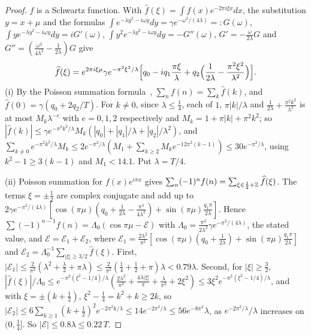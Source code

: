 \begin{proof}
$f$ is a Schwartz function. With $\widehat f(\xi)=\int f(x)e^{-2\pi i\xi x}dx$,
the substitution $y=x+\mu$ and the formulas $\int e^{-\lambda y^2-i\omega y}dy=
\gamma e^{-\omega^2/(4\lambda)}=:G(\omega)$, $\int ye^{-\lambda y^2-i\omega y}dy
=iG'(\omega)$, $\int y^2e^{-\lambda y^2-i\omega y}dy=-G''(\omega)$, $G'=-\frac
\omega{2\lambda}G$ and $G''=(\frac{\omega^2}{4\lambda^2}-\frac1{2\lambda})G$ give
\[
\widehat f(\xi)=e^{2\pi i\xi\mu}\gamma e^{-\pi^2\xi^2/\lambda}\Bigl[q_0-iq_1
\frac{\pi\xi}\lambda+q_2\Bigl(\frac1{2\lambda}-\frac{\pi^2\xi^2}{\lambda^2}
\Bigr)\Bigr].
\]
(i) By the Poisson summation formula~\cite[Ch.~5]{SS03}, $\sum_nf(n)=\sum_k
\widehat f(k)$, and $\widehat f(0)=\gamma(q_0+2q_2/T)$. For $k\ne0$, since
$\lambda\le\frac14$, each of $1$, $\pi|k|/\lambda$ and $\frac1{2\lambda}+
\frac{\pi^2k^2}{\lambda^2}$ is at most $M_k\lambda^{-e}$ with $e=0,1,2$
respectively and $M_k=1+\pi|k|+\pi^2k^2$; so $|\widehat f(k)|\le\gamma e^{-\pi^2
k^2/\lambda}M_k(|q_0|+|q_1|/\lambda+|q_2|/\lambda^2)$, and $\sum_{k\ne0}e^{-\pi^2
k^2/\lambda}M_k\le2e^{-\pi^2/\lambda}(M_1+\sum_{k\ge2}M_ke^{-12\pi^2(k-1)})\le
30e^{-\pi^2/\lambda}$, using $k^2-1\ge3(k-1)$ and $M_1<14.1$. Put $\lambda=T/4$.

(ii) Poisson summation for $f(x)e^{i\pi x}$ gives $\sum_n(-1)^nf(n)=\sum_{\xi\in
\frac12+\mathbb{Z}}\widehat f(\xi)$. The terms $\xi=\pm\frac12$ are complex conjugate
and add up to $2\gamma e^{-\pi^2/(4\lambda)}[\cos(\pi\mu)(q_0+\frac1{2\lambda}-
\frac{\pi^2}{4\lambda^2})+\sin(\pi\mu)\frac{q_1\pi}{2\lambda}]$. Hence
$\sum(-1)^{n-1}f(n)=\Lambda_0(\cos\pi\mu-\mathcal E)$ with $\Lambda_0=\frac{\pi^2}
{2\lambda^2}\gamma e^{-\pi^2/(4\lambda)}$, the stated value, and $\mathcal E=
\mathcal E_1+\mathcal E_2$, where $\mathcal E_1=\frac{2\lambda^2}{\pi^2}[\cos(\pi
\mu)(q_0+\frac1{2\lambda})+\sin(\pi\mu)\frac{q_1\pi}{2\lambda}]$ and $\mathcal
E_2=\Lambda_0^{-1}\sum_{|\xi|\ge3/2}\widehat f(\xi)$. First, $|\mathcal E_1|\le
\frac2{\pi^2}(\lambda^2+\frac\lambda2+\pi\lambda)\le\frac2{\pi^2}(\frac14+\frac12+
\pi)\lambda<0.79\lambda$. Second, for $|\xi|\ge\frac32$, $|\widehat f(\xi)|/
\Lambda_0\le e^{-\pi^2(\xi^2-1/4)/\lambda}(\frac{2\lambda^2}{\pi^2}+\frac{4\lambda
|\xi|}\pi+\frac\lambda{\pi^2}+2\xi^2)\le3\xi^2e^{-\pi^2(\xi^2-1/4)/\lambda}$, and
with $\xi=\pm(k+\frac12)$, $\xi^2-\frac14=k^2+k\ge2k$, so $|\mathcal E_2|\le6
\sum_{k\ge1}(k+\frac12)^2e^{-2\pi^2k/\lambda}\le14e^{-2\pi^2/\lambda}\le56
e^{-8\pi^2}\lambda$, as $e^{-2\pi^2/\lambda}/\lambda$ increases on $(0,\frac14]$.
So $|\mathcal E|\le0.8\lambda\le0.22\,T$.
\end{proof}

